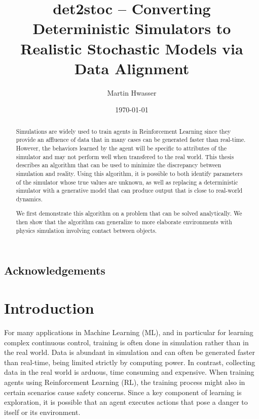 \documentclass{kththesis}
\title{det2stoc -- Converting Deterministic Simulators to Realistic Stochastic Models via Data Alignment}
\author{Martin Hwasser}
\date{\today}
\begin{document}
\frontmatter
\titlepage
\begin{abstract}
Simulations are widely used to train agents in Reinforcement Learning since they provide an affluence of data that in many cases can be generated faster than real-time. However, the behaviors learned by the agent will be specific to attributes of the simulator and may not perform well when transfered to the real world. This thesis describes an algorithm that can be used to minimize the discrepancy between simulation and reality. Using this algorithm, it is possible to both identify parameters of the simulator whose true values are unknown, as well as replacing a deterministic simulator with a generative model that can produce output that is close to real-world dynamics.

We first demonstrate this algorithm on a problem that can be solved analytically. We then show that the algorithm can generalize to more elaborate environments with physics simulation involving contact between objects.

\end{abstract}
\begin{otherlanguage}{swedish}
  \begin{abstract}
  \end{abstract}
\end{otherlanguage}

\section*{Acknowledgements}


\tableofcontents
\mainmatter
\chapter{Introduction}
\label{introduction}
For many applications in Machine Learning (ML), and in particular for learning complex continuous control, training is often done in simulation rather than in the real world. Data is abundant in simulation and can often be generated faster than real-time, being limited strictly by computing power. In contrast, collecting data in the real world is arduous, time consuming and expensive. When training agents using Reinforcement Learning (RL), the training process might also in certain scenarios cause safety concerns. Since a key component of learning is exploration, it is possible that an agent executes actions that pose a danger to itself or its environment.
\end{document}
